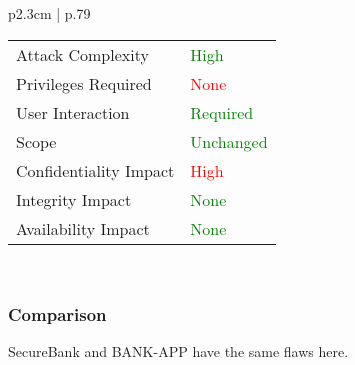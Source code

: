 \begin{longtable}{ p{2.3cm} | p{.79\linewidth} }
\begin{tabular}[t]{@{}l | l}
            Attack Complexity       & \textcolor{Green}{High} \\
            Privileges Required     & \textcolor{red}{None} \\
            User Interaction        & \textcolor{Green}{Required} \\
            Scope                   & \textcolor{Green}{Unchanged} \\
            Confidentiality Impact  & \textcolor{red}{High} \\
            Integrity Impact        & \textcolor{Green}{None} \\
            Availability Impact     & \textcolor{Green}{None}
        \end{tabular} \\
   	\hline
\end{longtable}

\subsubsection{Comparison}
SecureBank and BANK-APP have the same flaws here.
\clearpage
